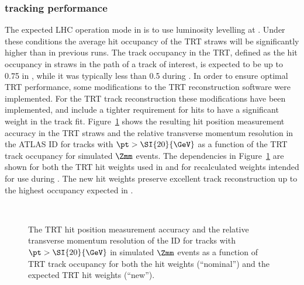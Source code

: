 \documentclass[cernpreprint, atlasdraft=false, UKenglish,british,orcidlogo, texmf, orcidlogo]{atlasdoc}
\begin{document}
\subsubsection{ tracking performance}
\label{sss:trtPerf}
The expected \gls{LHC} operation mode in \RunThr is to use luminosity levelling at \lumirunthree. Under these conditions the average hit occupancy of the \gls{TRT} straws will be significantly higher than in previous runs. The track occupancy in the \gls{TRT}, defined as the hit occupancy in straws in the path of a track of interest, is expected to be up to 0.75 in \RunThr, while it was typically less than 0.5 during \RunTwo. In order to ensure optimal \gls{TRT} performance, some modifications to the \gls{TRT} reconstruction software were implemented. For the \gls{TRT} track reconstruction these modifications have been implemented, and include a tighter requirement for hits to have a significant weight in the track fit. Figure~\ref{fig:hitReso} shows the resulting hit position measurement accuracy in the \gls{TRT} straws and the relative transverse momentum resolution in the ATLAS \gls{ID} for tracks with $\pt > \SI{20}{\GeV}$ as a function of the \gls{TRT} track occupancy for simulated $\Zmm$ events. The dependencies in Figure~\ref{fig:hitReso} are shown for both the \gls{TRT} hit weights used in \RunTwo and for recalculated weights intended for use during \RunThr. The new hit weights preserve excellent track reconstruction up to the highest occupancy expected in \RunThr.
 
\begin{figure}[htbp]
\centering
{}\\
\caption{
\protect{} The \gls{TRT} hit position measurement accuracy and \protect{} the relative transverse momentum resolution of the \gls{ID} for tracks with $\pt > \SI{20}{\GeV}$ in simulated $\Zmm$ events as a function of \gls{TRT} track occupancy for both the \RunTwo hit weights (``nominal'') and the expected \RunThr \gls{TRT} hit weights (``new'').
}
\label{fig:hitReso}
\end{figure}
 



\end{document}
